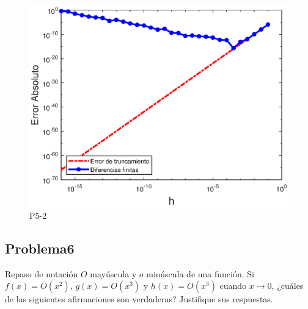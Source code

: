 \documentclass[12pt, a4paper]{article}%
\begin{document}
\begin{figure}[H]
    \centering
    \includegraphics[width=0.65\linewidth]{Gráficas/P5-2.eps}
    \caption{P5-2}
    \label{figcoyoyoyo}
\end{figure}

\subsection*{Problema6}
Repaso de notación \( O \) mayúscula y \( o \) minúscula de una función. Si \( f(x) = O(x^2) \), \( g(x) = O(x^3) \) y \( h(x) = O(x^3) \) cuando \( x \to 0 \), ¿cuáles de las siguientes afirmaciones son verdaderas? Justifique sus respuestas.
\end{document}
